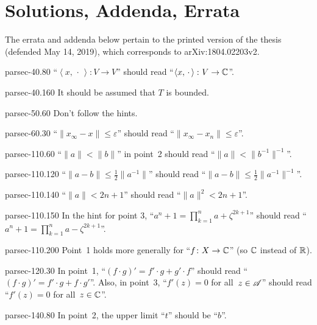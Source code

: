 \documentclass[b5page]{book}
\begin{document}
\appendix
\chapter{Solutions, Addenda, Errata}
The errata and addenda below pertain to the printed version of the thesis
(defended May 14, 2019), which corresponds to arXiv:1804.02203v2.
\begin{erratum}{parsec-40.80}%
``$\left<x,\,\cdot\,\right>\colon V\to V$''
should read
``$\left<x,\,\cdot\,\right>\colon V\to \mathbb{C}$''.
\end{erratum}
\begin{erratum}{parsec-40.160}%
    It should be assumed that $T$ is bounded.
\end{erratum}
\begin{erratum}{parsec-50.60}%
Don't follow the hints.
\end{erratum}
\begin{erratum}{parsec-60.30}%
    ``$\|x_\infty-x\|\leq \varepsilon$'' should read  ``$\|x_\infty-x_n\|\leq\varepsilon$''.
\end{erratum}
\begin{erratum}{parsec-110.60}
``$\|a\| < \|b\|$'' in point~2
    should read ``$\|a\|<  \|b^{-1}\|^{-1}$''.
\end{erratum}
\begin{erratum}{parsec-110.120}
``$\|a-b\|\leq \frac12 \|a^{-1}\|$''
should read
	``$\|a-b\|\leq \frac12 \|a^{-1}\|^{-1}$''.
\end{erratum}
\begin{erratum}{parsec-110.140}
``$\|a\|<2n+1$'' should read ``$\|a\|^2<2n+1$''.
\end{erratum}
\begin{erratum}{parsec-110.150}
In the hint for point 3,
``$a^n+1 = \prod_{k=1}^n a+\zeta^{2k+1}$''
should read
``$a^n+1 = \prod_{k=1}^n a-\zeta^{2k+1}$''.
\end{erratum}
\begin{addendum}{parsec-110.200}
Point~1 holds more generally for ``$f\colon X\to \mathbb{C}$''
(so $\mathbb{C}$ instead of $\mathbb{R}$).
\end{addendum}
\begin{erratum}{parsec-120.30}
In point~1,
``$(f\cdot g)'=f'\cdot g + g'\cdot f$'' should
    read ``$(f\cdot g)' = f'\cdot g + f\cdot g'$''.
Also, in point~3,
``$f'(z)=0$ for all~$z\in \mathscr{A}$''
should read
``$f'(z)=0$ for all~$z\in \mathbb{C}$''.
\end{erratum}
\begin{erratum}{parsec-140.80}
In point~2, the upper limit ``$t$'' should be ``$b$''.
\end{erratum}
\end{document}
